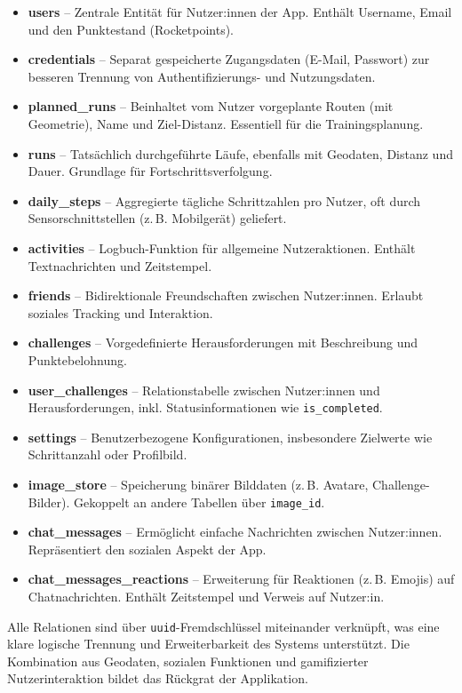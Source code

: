 \documentclass[11pt,a4paper]{article}
\begin{document}
\begin{itemize}
    \item \textbf{users} – Zentrale Entität für Nutzer:innen der App. Enthält Username, Email und den Punktestand (Rocketpoints).
    \item \textbf{credentials} – Separat gespeicherte Zugangsdaten (E-Mail, Passwort) zur besseren Trennung von Authentifizierungs- und Nutzungsdaten.
    \item \textbf{planned\_runs} – Beinhaltet vom Nutzer vorgeplante Routen (mit Geometrie), Name und Ziel-Distanz. Essentiell für die Trainingsplanung.
    \item \textbf{runs} – Tatsächlich durchgeführte Läufe, ebenfalls mit Geodaten, Distanz und Dauer. Grundlage für Fortschrittsverfolgung.
    \item \textbf{daily\_steps} – Aggregierte tägliche Schrittzahlen pro Nutzer, oft durch Sensorschnittstellen (z.\,B. Mobilgerät) geliefert.
    \item \textbf{activities} – Logbuch-Funktion für allgemeine Nutzeraktionen. Enthält Textnachrichten und Zeitstempel.
    \item \textbf{friends} – Bidirektionale Freundschaften zwischen Nutzer:innen. Erlaubt soziales Tracking und Interaktion.
    \item \textbf{challenges} – Vorgedefinierte Herausforderungen mit Beschreibung und Punktebelohnung.
    \item \textbf{user\_challenges} – Relationstabelle zwischen Nutzer:innen und Herausforderungen, inkl. Statusinformationen wie \texttt{is\_completed}.
    \item \textbf{settings} – Benutzerbezogene Konfigurationen, insbesondere Zielwerte wie Schrittanzahl oder Profilbild.
    \item \textbf{image\_store} – Speicherung binärer Bilddaten (z.\,B. Avatare, Challenge-Bilder). Gekoppelt an andere Tabellen über \texttt{image\_id}.
    \item \textbf{chat\_messages} – Ermöglicht einfache Nachrichten zwischen Nutzer:innen. Repräsentiert den sozialen Aspekt der App.
    \item \textbf{chat\_messages\_reactions} – Erweiterung für Reaktionen (z.\,B. Emojis) auf Chatnachrichten. Enthält Zeitstempel und Verweis auf Nutzer:in.
\end{itemize}

Alle Relationen sind über \texttt{uuid}-Fremdschlüssel miteinander verknüpft, was eine klare logische Trennung und Erweiterbarkeit des Systems unterstützt. Die Kombination aus Geodaten, sozialen Funktionen und gamifizierter Nutzerinteraktion bildet das Rückgrat der Applikation.
\end{document}
